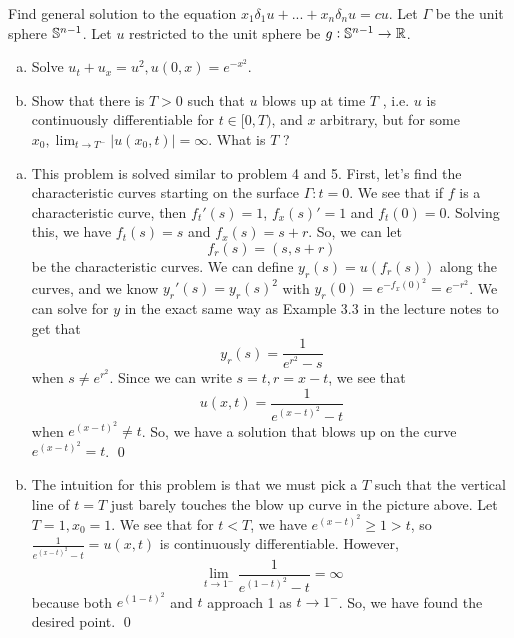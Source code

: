 \documentclass{article}
\renewcommand{\d}{\delta}
\begin{document}
\newpage
{} Find general solution to the equation $x_1\d_1u + ... + x_n\d_nu = cu$. \tri
\hop
\solution Let $\Gamma$ be the unit sphere $\mathbb{S}^{n-1}$. Let $u$ restricted to the unit sphere be $g: \mathbb{S}^{n-1} \to \mathbb{R}$. 


\newpage
{} 
\begin{enumerate}[(a)]
    \item Solve $u_t + u_x = u^2, u(0, x) = e^{-x^2}$.
    \item Show that there is $T > 0$ such that $u$ blows up at time $T$ , i.e. $u$ is continuously differentiable
    for $t \in [0, T )$, and $x$ arbitrary, but for some $x_0, \lim_{t\to T^-}|u(x_0, t)|= \infty$. What is $T$ ?
\end{enumerate}
\tri
\hop
\solution
\begin{enumerate}[(a)]
    \item This problem is solved similar to problem 4 and 5. First, let's find the characteristic curves starting on the surface $\Gamma: t = 0$. We see that if $f$ is a characteristic curve, then $f_t'(s) = 1$, $f_x(s)' =1$ and $f_t(0)= 0$.
    \hop
    Solving this, we have $f_t(s) = s$ and $f_x(s) = s+r$. So, we can let
    \[f_r(s)=(s, s+r)\]
    be the characteristic curves. We can define $y_r(s) = u(f_r(s))$ along the curves, and we know $y_r'(s) = y_r(s)^2$ with $y_r(0) = e^{-f_x(0)^2} = e^{-r^2}$. 
    \hop
    We can solve for $y$ in the exact same way as Example 3.3 in the lecture notes to get that 
    \[y_r(s) = \frac{1}{e^{r^2}-s}\]
    when $s \ne e^{r^2}$. Since we can write $s = t, r = x-t$, we see that 
    \[u(x,t) = \frac{1}{e^{(x-t)^2}-t}\]
    when $e^{(x-t)^2} \ne t$. So, we have a solution that blows up on the curve $e^{(x-t)^2} = t$. \qed

    \item The intuition for this problem is that we must pick a $T$ such that the vertical line of $t = T$ just barely touches the blow up curve in the picture above.
    \hop
    Let $T=1, x_0 = 1$. We see that for $t < T$, we have $e^{(x-t)^2} \ge 1 > t$,  so $\frac{1}{e^{(x-t)^2}-t} = u(x,t)$ is continuously differentiable. However, 
    \[\lim_{t \to 1^-}\frac{1}{e^{(1-t)^2}-t} = \infty\]
    because both $e^{(1-t)^2}$ and $t$ approach 1 as $t \to 1^-$. So, we have found the desired point. \qed
\end{enumerate}
\end{document}
